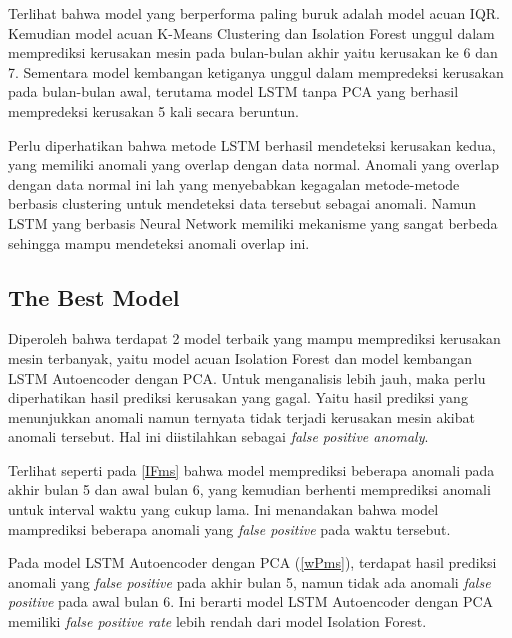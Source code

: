     Terlihat bahwa model yang berperforma paling buruk adalah model acuan IQR. Kemudian model acuan K-Means Clustering dan Isolation Forest unggul dalam memprediksi kerusakan mesin pada bulan-bulan akhir yaitu kerusakan ke 6 dan 7. Sementara model kembangan ketiganya unggul dalam mempredeksi kerusakan pada bulan-bulan awal, terutama model LSTM tanpa PCA yang berhasil mempredeksi kerusakan 5 kali secara beruntun.

    Perlu diperhatikan bahwa metode LSTM berhasil mendeteksi kerusakan kedua, yang memiliki anomali yang overlap dengan data normal. Anomali yang overlap dengan data normal ini lah yang menyebabkan kegagalan metode-metode berbasis clustering untuk mendeteksi data tersebut sebagai anomali. Namun LSTM yang berbasis Neural Network memiliki mekanisme yang sangat berbeda sehingga mampu mendeteksi anomali overlap ini.

    \subsection{The Best Model}

    Diperoleh bahwa terdapat 2 model terbaik yang mampu memprediksi kerusakan mesin terbanyak, yaitu model acuan Isolation Forest dan model kembangan LSTM Autoencoder dengan PCA. Untuk menganalisis lebih jauh, maka perlu diperhatikan hasil prediksi kerusakan yang gagal. Yaitu hasil prediksi yang menunjukkan anomali namun ternyata tidak terjadi kerusakan mesin akibat anomali tersebut. Hal ini diistilahkan sebagai \emph{false positive anomaly}.

    Terlihat seperti pada \ref{IFms} bahwa model memprediksi beberapa anomali pada akhir bulan 5 dan awal bulan 6, yang kemudian berhenti memprediksi anomali untuk interval waktu yang cukup lama. Ini menandakan bahwa model mamprediksi beberapa anomali yang \emph{false positive} pada waktu tersebut.

    Pada model LSTM Autoencoder dengan PCA (\ref{wPms}), terdapat hasil prediksi anomali yang \emph{false positive} pada akhir bulan 5, namun tidak ada anomali \emph{false positive} pada awal bulan 6. Ini berarti model LSTM Autoencoder dengan PCA memiliki \emph{false positive rate} lebih rendah dari model Isolation Forest.